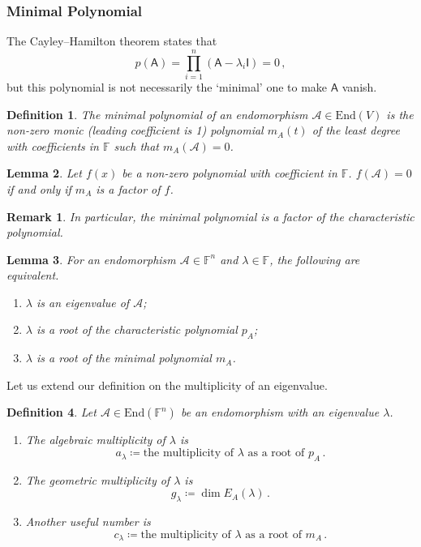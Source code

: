\documentclass{article}
\theoremstyle{plain}\theoremheaderfont{\normalfont\itshape}\theorembodyfont{\rmfamily}\theoremseparator{.}\newtheorem*{rem}{Remark}\newtheorem*{ex}{Example}\newtheorem*{proof}{Proof}\newtheorem*{altp}{Alternative proof}
\theoremstyle{plain}\theoremheaderfont{\normalfont\bfseries}\theorembodyfont{\rmfamily}\theoremseparator{.}\newtheorem{thm}{Theorem}[section]\newtheorem{lem}[thm]{Lemma}\newtheorem{prop}[thm]{Proposition}\newtheorem*{cor}{Corollary}\newtheorem{defn}[thm]{Definition}\newtheorem{clm}[thm]{Claim}\newtheorem{clminproof}{Claim}
\theoremstyle{break}\theoremheaderfont{\normalfont\itshape}\theorembodyfont{\rmfamily}\theoremseparator{.\medskip}\newtheorem*{proofskip}{Proof}\newtheorem*{exs}{Examples}\newtheorem*{rems}{Remarks}
\theoremstyle{break}\theoremheaderfont{\normalfont\bfseries}\theorembodyfont{\rmfamily}\theoremseparator{.\medskip}\newtheorem{lemskip}[thm]{Lemma}\newtheorem{defnskip}[thm]{Definition}\newtheorem{propskip}[thm]{Proposition}\newtheorem{thmskip}[thm]{Theorem}
\numberwithin{equation}{section}
\begin{document}
	\subsubsection{Minimal Polynomial}
	The Cayley--Hamilton theorem states that
	\[p(\mathsf{A})=\prod_{i=1}^{n}(\mathsf{A}-\lambda_i\mathsf{I})=0\,,\]
	but this polynomial is not necessarily the `minimal' one to make \(\mathsf{A}\) vanish.
	\begin{defn}
		The \textit{minimal polynomial} of an endomorphism \(\mathcal{A}\in\mathrm{End}(V)\) is the non-zero monic (leading coefficient is 1) polynomial \(m_A(t)\) of the least degree with coefficients in \(\mathbb{F}\) such that \(m_A(\mathcal{A})=0\).
	\end{defn}
	\begin{lem}
		Let \(f(x)\) be a non-zero polynomial with coefficient in \(\mathbb{F}\). \(f(\mathcal{A})=0\) if and only if \(m_A\) is a factor of \(f\).
	\end{lem}
	\begin{rem}
		In particular, the minimal polynomial is a factor of the characteristic polynomial.
	\end{rem}
	\begin{lem}
		For an endomorphism \(\mathcal{A}\in\mathbb{F}^n\) and \(\lambda\in\mathbb{F}\), the following are equivalent.
		\begin{enumerate}[topsep=0pt]
			\item[(i)] \(\lambda\) is an eigenvalue of \(\mathcal{A}\);
			\item[(ii)] \(\lambda\) is a root of the characteristic polynomial \(p_A\);
			\item[(iii)] \(\lambda\) is a root of the minimal polynomial \(m_A\). 
		\end{enumerate}
	\end{lem}
	Let us extend our definition on the multiplicity of an eigenvalue.
	\begin{defn}
		Let \(\mathcal{A}\in\mathrm{End}(\mathbb{F}^n)\) be an endomorphism with an eigenvalue \(\lambda\).
		\begin{enumerate}[topsep=0pt]
			\item[(i)] The \textit{algebraic multiplicity} of \(\lambda\) is
			\[a_\lambda\coloneqq\text{the multiplicity of }\lambda\text{ as a root of }p_A\,.\]
			\item[(ii)] The \textit{geometric multiplicity} of \(\lambda\) is
			\[g_\lambda\coloneqq\dim E_A(\lambda)\,.\]
			\item[(iii)] Another useful number is
			\[c_\lambda\coloneqq\text{the multiplicity of }\lambda\text{ as a root of }m_A\,.\]
		\end{enumerate}
	\end{defn}
\end{document}
